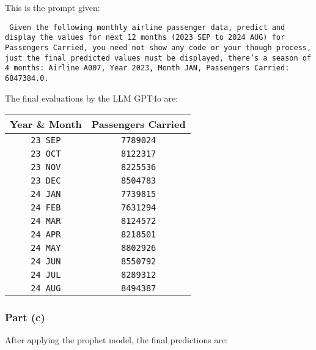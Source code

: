 This is the prompt given:
\begin{center}
	\texttt{
		Given the following monthly airline passenger data, predict and display the
		values for next 12 months (2023 SEP to 2024 AUG) for Passengers Carried, you
		need not show any code or your though process, just the final predicted values
		must be displayed, there's a season of 4 months: Airline A007, Year 2023,
		Month JAN, Passengers Carried: 6847384.0.
	}
\end{center}

The final evaluations by the LLM GPT4o are:

\begin{center}
	\begin{tabular}{|c|c|}
		\hline
		Year \& Month   & Passengers Carried \\
		\hline
		\texttt{23 SEP} & \texttt{7789024}   \\
		\texttt{23 OCT} & \texttt{8122317}   \\
		\texttt{23 NOV} & \texttt{8225536}   \\
		\texttt{23 DEC} & \texttt{8504783}   \\
		\texttt{24 JAN} & \texttt{7739815}   \\
		\texttt{24 FEB} & \texttt{7631294}   \\
		\texttt{24 MAR} & \texttt{8124572}   \\
		\texttt{24 APR} & \texttt{8218501}   \\
		\texttt{24 MAY} & \texttt{8802926}   \\
		\texttt{24 JUN} & \texttt{8550792}   \\
		\texttt{24 JUL} & \texttt{8289312}   \\
		\texttt{24 AUG} & \texttt{8494387}   \\
		\hline
	\end{tabular}
\end{center}

\subsubsection{Part (c)}

After applying the prophet model, the final predictions are:

